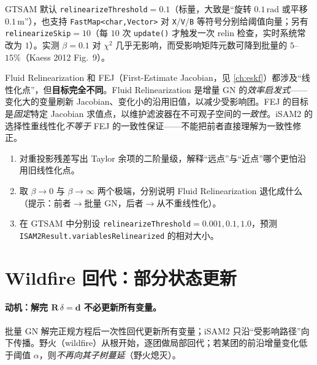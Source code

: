 \noindent GTSAM 默认 \texttt{relinearizeThreshold}$=0.1$（标量，大致是“旋转 $0.1$\,rad 或平移 $0.1$\,m”），也支持 \texttt{FastMap<char,Vector>} 对 \texttt{X}/\allowbreak\texttt{V}/\allowbreak\texttt{B} 等符号分别给阈值向量；另有 \texttt{relinearizeSkip}$=10$（每 $10$ 次 \texttt{update()} 才触发一次 relin 检查，实时系统常改为 $1$）。实测 $\beta=0.1$ 对 $\chi^2$ 几乎无影响，而受影响矩阵元数可降到批量的 $5$--$15\%$（Kaess 2012 Fig.~9\cite{kaess2012isam2}）。

\begin{pitfall}
Fluid Relinearization 和 FEJ（First-Estimate Jacobian，见 \cref{ch:eskf}）都涉及“线性化点”，但\textbf{目标完全不同}。Fluid Relinearization 是增量 GN 的\emph{效率启发式}——变化大的变量刷新 Jacobian、变化小的沿用旧值，以减少受影响团。FEJ 的目标是\emph{固定}特定 Jacobian 求值点，以维护滤波器在不可观子空间的\emph{一致性}。iSAM2 的选择性重线性化\emph{不等于} FEJ 的一致性保证——不能把前者直接理解为一致性修正。
\end{pitfall}

\begin{practice}
\begin{enumerate}
  \item 对重投影残差写出 Taylor 余项的二阶量级，解释“远点”与“近点”哪个更怕沿用旧线性化点。
  \item 取 $\beta\to 0$ 与 $\beta\to\infty$ 两个极端，分别说明 Fluid Relinearization 退化成什么（提示：前者$\to$批量 GN，后者$\to$从不重线性化）。
  \item 在 GTSAM 中分别设 \texttt{relinearizeThreshold}$=0.001,0.1,1.0$，预测 \texttt{ISAM2Result.\allowbreak variablesRelinearized} 的相对大小。
\end{enumerate}
\end{practice}

\section{Wildfire 回代：部分状态更新}
\label{sec:isam-wildfire}

\paragraph{动机：解完 $\mathbf{R}\,\delta=\mathbf{d}$ 不必更新所有变量。}
批量 GN 解完正规方程后一次性回代更新所有变量；iSAM2 只沿“受影响路径”向下传播。野火（wildfire）从根开始，逐团做局部回代；若某团的前沿增量变化低于阈值 $\alpha$，则\emph{不再向其子树蔓延}（野火熄灭）。

